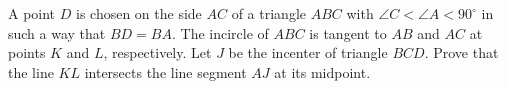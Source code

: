 A point $D$ is chosen on the side $AC$ of a triangle $ABC$ with $\angle C < \angle A < 90^\circ$ in such a way that $BD=BA$.  The incircle of $ABC$ is tangent to $AB$ and $AC$ at points $K$ and $L$,  respectively.  Let $J$ be the incenter of triangle $BCD$.  Prove that the line $KL$ intersects the line segment $AJ$ at its midpoint.